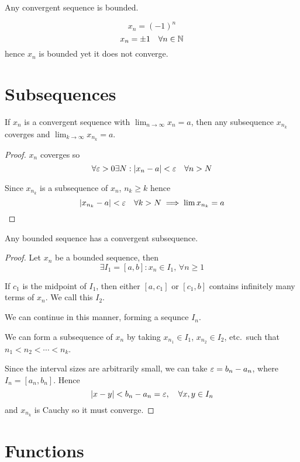 \documentclass[a4paper,10pt]{article}
\begin{document}
\begin{cor}
	Any convergent sequence is bounded.
\end{cor}

\begin{ex}
	\[
		x_n = {(-1)}^n
	\]
	\[
		x_n = \pm 1 \quad \forall n \in \mathbb{N}
	\]
	hence $x_n$ is bounded yet it does not converge.
\end{ex}

\section{Subsequences}

\begin{prop}
	If $x_n$ is a convergent sequence with $\lim_{n \to \infty} x_n
	= a$, then any subsequence $x_{n_k}$ coverges and $\lim_{k \to
	\infty} x_{n_k} = a$.
\end{prop}

\begin{proof}
	$x_n$ coverges so
	\[
		\forall \varepsilon > 0 \exists N : |x_n - a| < \varepsilon \quad \forall n > N
	\]

	Since $x_{n_k}$ is a subsequence of $x_n$, $n_k \geq k$ hence
	\[
		| x_{n_k} -a | < \varepsilon \quad \forall k > N
		\implies \lim x_{n_k} = a
	\]
\end{proof}

\begin{thm}
	Any bounded sequence has a convergent subsequence.
\end{thm}

\begin{proof}
	Let $x_n$ be a bounded sequence, then
	\[
		\exists I_1 = [a,b] : x_n \in I_1, \, \forall n \geq 1
	\]

	If $c_1$ is the midpoint of $I_1$, then either $[a,c_1]$ or
	$[c_1,b]$ contains infinitely many terms of $x_n$. We call this
	$I_2$.

	We can continue in this manner, forming a sequnce $I_n$.

	We can form a subsequence of $x_n$ by taking $x_{n_1} \in I_1$,
	$x_{n_2} \in I_2$, etc.\ such that $n_1 < n_2 < \cdots < n_k$.

	Since the interval sizes are arbitrarily small, we can take
	$\varepsilon = b_n - a_n$, where $I_n = [a_n,b_n]$. Hence
	\[
		|x-y| < b_n - a_n = \varepsilon, \quad \forall x,y \in I_n
	\]
	and $x_{n_k}$ is Cauchy so it must converge.
\end{proof}

\section{Functions}
\end{document}
